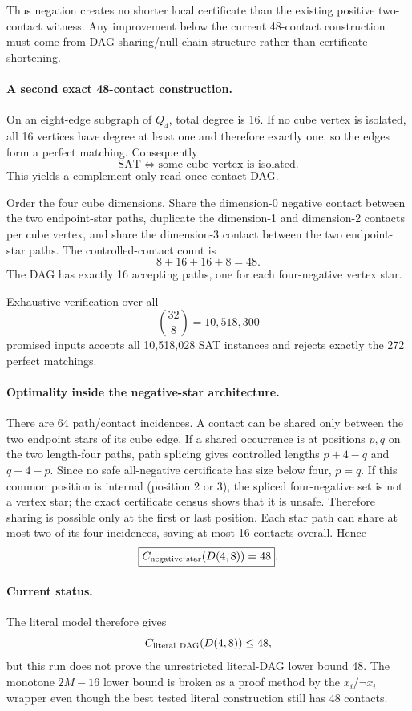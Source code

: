 Thus negation creates no shorter local certificate than the existing positive two-contact
witness.  Any improvement below the current 48-contact construction must come from DAG
sharing/null-chain structure rather than certificate shortening.

\paragraph{A second exact 48-contact construction.}
On an eight-edge subgraph of $Q_4$, total degree is 16.  If no cube vertex is isolated, all
16 vertices have degree at least one and therefore exactly one, so the edges form a perfect
matching.  Consequently
\[
\mathrm{SAT}\iff\text{some cube vertex is isolated}.
\]
This yields a complement-only read-once contact DAG.

Order the four cube dimensions.  Share the dimension-0 negative contact between the two
endpoint-star paths, duplicate the dimension-1 and dimension-2 contacts per cube vertex, and
share the dimension-3 contact between the two endpoint-star paths.  The controlled-contact
count is
\[
8+16+16+8=48.
\]
The DAG has exactly 16 accepting paths, one for each four-negative vertex star.

Exhaustive verification over all
\[
\binom{32}{8}=10{,}518{,}300
\]
promised inputs accepts all 10,518,028 SAT instances and rejects exactly the 272 perfect
matchings.

\paragraph{Optimality inside the negative-star architecture.}
There are 64 path/contact incidences.  A contact can be shared only between the two endpoint
stars of its cube edge.  If a shared occurrence is at positions $p,q$ on the two length-four
paths, path splicing gives controlled lengths $p+4-q$ and $q+4-p$.  Since no safe
all-negative certificate has size below four, $p=q$.  If this common position is internal
(position 2 or 3), the spliced four-negative set is not a vertex star; the exact certificate
census shows that it is unsafe.  Therefore sharing is possible only at the first or last
position.  Each star path can share at most two of its four incidences, saving at most 16
contacts overall.  Hence
\[
\boxed{C_{\rm negative\mbox{-}star}(D(4,8))=48}.
\]

\paragraph{Current status.}
The literal model therefore gives
\[
C_{\rm literal\ DAG}(D(4,8))\le48,
\]
but this run does not prove the unrestricted literal-DAG lower bound 48.  The monotone
$2M-16$ lower bound is broken as a proof method by the $x_i/\neg x_i$ wrapper even though
the best tested literal construction still has 48 contacts.

